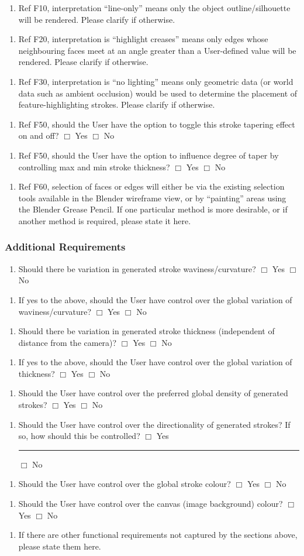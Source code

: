 \documentclass[a4paper,10pt]{article}
\newcommand{\Qq}[1]{#1}
\newcommand{\QO}{$\Box$}%
\newcommand{\Qline}[1]{\noindent\rule{#1}{0.6pt}}
\newcounter{ql}
\newcommand{\Qlines}[1]{\forloop{ql}{0}{\value{ql}<#1}{\vskip0em\Qline{\linewidth}}}
\newcommand{\Qitemf}[2][]{
\begin{enumerate}[topsep=2pt,leftmargin=2.8em]
\item[\textbf{F\arabic{fReqNum}#1.}] #2
\addtocounter{fReqNum}{10}
\end{enumerate}
}
\newcommand{\Qitemclar}[2][]{
\begin{enumerate}[topsep=2pt,leftmargin=2.8em]
\item[\textbf{C\arabic{clarNum}#1.}] #2
\addtocounter{clarNum}{10}
\end{enumerate}
}
\begin{document}
\Qitemclar{\Qq{Ref F10, interpretation ``line-only'' means only the object outline/silhouette will be rendered. Please clarify if otherwise.} \Qlines{2}}
\Qitemclar{\Qq{Ref F20, interpretation is ``highlight creases'' means only edges whose neighbouring faces meet at an angle greater than a User-defined value will be rendered. Please clarify if otherwise.} \Qlines{2}}
\Qitemclar{\Qq{Ref F30, interpretation is ``no lighting'' means only geometric data (or world data such as ambient occlusion) would be used to determine the placement of feature-highlighting strokes. Please clarify if otherwise.} \Qlines{2}}
\Qitemclar{\Qq{Ref F50, should the User have the option to toggle this stroke tapering effect on and off?}  \newline \QO{} Yes \hskip0.5cm \QO{} No}
\Qitemclar{\Qq{Ref F50, should the User have the option to influence degree of taper by controlling max and min stroke thickness?} \newline \QO{} Yes \hskip0.5cm \QO{} No}
\Qitemclar{\Qq{Ref F60, selection of faces or edges will either be via the existing selection tools available in the Blender wireframe view, or by ``painting'' areas using the Blender Grease Pencil. If one particular method is more desirable, or if another method is required, please state it here.} \Qlines{4}}

\subsubsection{Additional Requirements}

\Qitemf{\Qq{Should there be variation in generated stroke waviness/curvature?} \newline \QO{} Yes \hskip0.5cm \QO{} No}
\Qitemf{\Qq{If yes to the above, should the User have control over the global variation of waviness/curvature?} \newline \QO{} Yes \hskip0.5cm \QO{} No}
\Qitemf{\Qq{Should there be variation in generated stroke thickness (independent of distance from the camera)?} \newline \QO{} Yes \hskip0.5cm \QO{} No}
\Qitemf{\Qq{If yes to the above, should the User have control over the global variation of thickness?} \newline \QO{} Yes \hskip0.5cm \QO{} No}
\Qitemf{\Qq{Should the User have control over the preferred global density of generated strokes?} \newline \QO{} Yes \hskip0.5cm \QO{} No}
\Qitemf{\Qq{Should the User have control over the directionality of generated strokes? If so, how should this be controlled?} \newline \QO{} Yes \Qline{8cm} \hskip0.5cm \QO{} No}
\Qitemf{\Qq{Should the User have control over the global stroke colour?} \newline \QO{} Yes \hskip0.5cm \QO{} No}
\Qitemf{\Qq{Should the User have control over the canvas (image background) colour?} \newline \QO{} Yes \hskip0.5cm \QO{} No}
\Qitemf{\Qq{If there are other functional requirements not captured by the sections above, please state them here.} \Qlines{10}}
\end{document}
